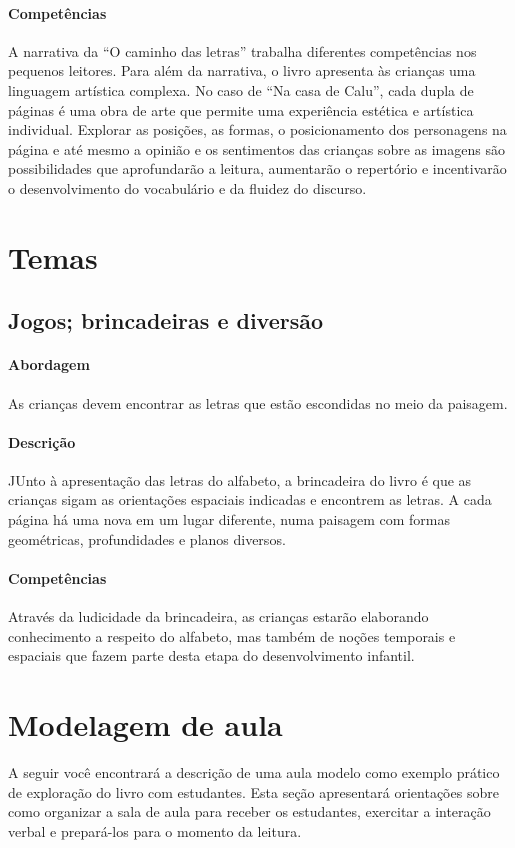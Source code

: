 \documentclass[11pt]{extarticle}
\begin{document}
\paragraph{Competências} 
A narrativa da ``O caminho das letras'' trabalha diferentes competências
nos pequenos leitores. Para além da narrativa, o livro
apresenta às crianças uma linguagem artística complexa. No caso de 
``Na casa de Calu'', cada dupla de páginas é uma obra de arte que permite 
uma experiência estética e artística individual. Explorar as posições, as formas, 
o posicionamento dos personagens na página e até mesmo a opinião e os sentimentos das crianças sobre as imagens 
são possibilidades que aprofundarão a leitura, aumentarão o repertório 
e incentivarão o desenvolvimento do vocabulário e da fluidez do discurso.  

\section{Temas}

\subsection{Jogos; brincadeiras e diversão}

\paragraph{Abordagem} 
As crianças devem encontrar as letras que estão escondidas
no meio da paisagem.
\paragraph{Descrição} 
JUnto à apresentação das letras do alfabeto, a brincadeira do livro
é que as crianças sigam as orientações espaciais indicadas e encontrem
as letras. A cada página há uma nova em um lugar diferente, numa
paisagem com formas geométricas, profundidades e planos diversos.
\paragraph{Competências} 
Através da ludicidade da brincadeira, as crianças estarão elaborando
conhecimento a respeito do alfabeto, mas também de noções temporais e
espaciais que fazem parte desta etapa do desenvolvimento infantil. 

\section{Modelagem de aula}
A seguir você encontrará a descrição de uma aula modelo como exemplo 
prático de exploração do livro com estudantes. Esta seção apresentará 
orientações sobre como organizar a sala de aula para receber os 
estudantes, exercitar a interação verbal e prepará-los para o 
momento da leitura.
\end{document}
